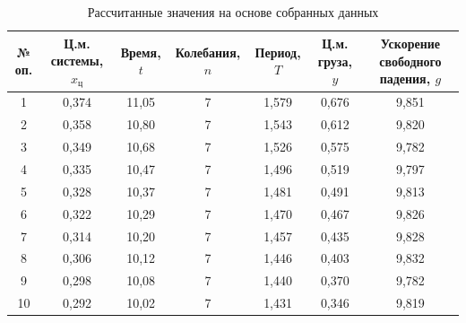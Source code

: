 \documentclass[a4paper]{article}
\begin{document}
\begin{table}[!h]
\begin{center}
\begin{tabular}{|c|c|c|c|c|c|c|}
\hline
№ оп.&Ц.м. системы, $x_{\text{ц}}$&Время, $t$&Колебания, $n$&Период, $T$&Ц.м. груза, $y$&Ускорение свободного падения, $g$\\ \hline
1       & 0,374                                  & 11,05                    & 7                     & 1,579                    & 0,676  & 9,851                                                              \\ \hline
2       & 0,358                                  & 10,80                    & 7                     & 1,543                    & 0,612  & 9,820                                                              \\ \hline
3       & 0,349                                  & 10,68                    & 7                     & 1,526                    & 0,575  & 9,782                                                              \\ \hline
4       & 0,335                                  & 10,47                    & 7                     & 1,496                    & 0,519  & 9,797                                                              \\ \hline
5       & 0,328                                  & 10,37                    & 7                     & 1,481                    & 0,491  & 9,813                                                              \\ \hline
6       & 0,322                                  & 10,29                    & 7                     & 1,470                    & 0,467  & 9,826                                                              \\ \hline
7       & 0,314                                  & 10,20                    & 7                     & 1,457                    & 0,435  & 9,828                                                              \\ \hline
8       & 0,306                                  & 10,12                    & 7                     & 1,446                    & 0,403  & 9,832                                                              \\ \hline
9       & 0,298                                  & 10,08                    & 7                     & 1,440                    & 0,370  & 9,782                                                              \\ \hline
10      & 0,292                                  & 10,02                    & 7                     & 1,431                    & 0,346  & 9,819                                                              \\ \hline
\end{tabular}
\caption{Рассчитанные значения на основе собранных данных}
\end{center}
\end{table}
\newpage
\end{document}
